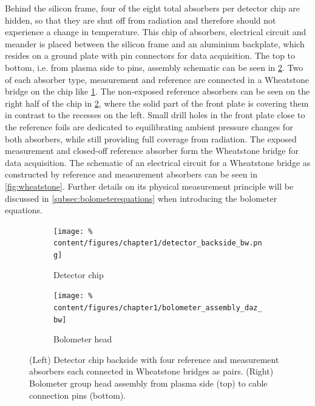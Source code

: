             Behind the silicon frame, four of the eight total absorbers per detector chip are hidden, so that they are shut off from radiation and therefore should not experience a change in temperature. This chip of absorbers, electrical circuit and meander is placed between the silicon frame and an aluminium backplate, which resides on a ground plate with pin connectors for data acquisition. The top to bottom, i.e. from plasma side to pins, assembly schematic can be seen in \cref{fig:assembly}. Two of each absorber type, measurement and reference are connected in a Wheatstone bridge on the chip like \cref{fig:chip}. The non-exposed reference absorbers can be seen on the right half of the chip in \cref{fig:assembly}, where the solid part of the front plate is covering them in contrast to the recesses on the left. Small drill holes in the front plate close to the reference foils are dedicated to equilibrating ambient pressure changes for both absorbers, while still providing full coverage from radiation. The exposed measurement and closed-off reference absorber form the Wheatstone bridge for data acquisition. The schematic of an electrical circuit for a Wheatstone bridge as constructed by reference and measurement absorbers can be seen in \cref{fig:wheatstone}. Further details on its physical measurement principle will be discussed in \cref{subsec:bolometerequations} when introducing the bolometer equations.\\%
%
            \begin{figure}[t]%
                \centering%
                \begin{subfigure}{0.375\textwidth}%
                    \centering%
                    \texttt{[image: \%
                        content/figures/chapter1/detector\_backside\_bw.png]}%
                    \vspace*{0.25cm}%
                    \caption{Detector chip}\label{fig:chip}%
                \end{subfigure}%
                \hspace*{1.0cm}%
                \begin{subfigure}{0.33\textwidth}%
                    \centering%
                    \texttt{[image: \%
                        content/figures/chapter1/bolometer\_assembly\_daz\_bw]}%
                    \caption{Bolometer head}\label{fig:assembly}%
                \end{subfigure}%
                \caption{(Left) Detector chip backside with four reference and measurement absorbers each connected in Wheatstone bridges as pairs. (Right) Bolometer group head assembly from plasma side (top) to cable connection pins (bottom).}\label{fig:wheatstone_assembly}%
            \end{figure}%
